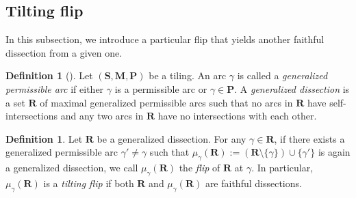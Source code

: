 \documentclass[a4paper,10pt]{amsart}
\theoremstyle{plain}          %
\theoremstyle{definition}
\newtheorem{definition}[theorem]{Definition}
\def\SS{\mathbf{S}}
\def\RR{\mathbf{R}}
\def\MM{\mathbf{M}}
\def\PP{\mathbf{P}}
\def\MM{\mathbf{M}}
\begin{document}
\subsection{Tilting flip}\label{s:tilting flip}
In this subsection, we introduce a particular flip that yields another faithful dissection from a given one.
\begin{definition}[{\cite[Definition 3.7]{HZZ}}]
Let $(\SS,\MM,\PP)$ be a tiling. An arc $\gamma$ is called a {\it generalized permissible arc} if either $\gamma$ is a permissible arc or $\gamma \in \PP$. A  {\it generalized dissection} is a  set $\mathbf{R}$ of maximal  generalized permissible arcs  such that no arcs in  $\mathbf{R}$ have self-intersections and any two arcs in  $\mathbf{R}$ have no intersections with each other.
\end{definition}
\begin{definition}
   Let $\mathbf{R}$ be a generalized dissection. For any $\gamma \in\mathbf{R}$, if there exists a generalized permissible arc $\gamma' \neq \gamma$ such that $\mu_\gamma(\RR) := (\RR \setminus \{\gamma\}) \cup \{\gamma'\}$ is again a generalized dissection, we call $\mu_\gamma(\RR)$ the {\it flip} of $\mathbf{R}$ at $\gamma$. In particular, $\mu_\gamma(\mathbf{R})$ is a {\it tilting flip} if both $\mathbf{R}$ and $\mu_\gamma(\RR)$ are faithful dissections.
\end{definition}
\end{document}
